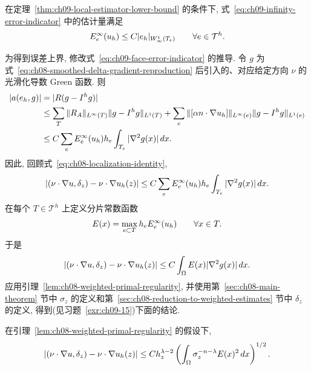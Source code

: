\begin{Theorem}
\label{thm:ch09-local-infinity-estimator}
在定理~\ref{thm:ch09-local-estimator-lower-bound} 的条件下, 式~\eqref{eq:ch09-infinity-error-indicator} 中的估计量满足
\[
\MathBookFormulaID{formula-ch09-local-infinity-estimator}
E_e^\infty(u_h)\leq C|e_h|_{W_\infty^1(T_e)}
\qquad\forall e\in\mathcal T^h.
\]
\end{Theorem}

为得到误差上界, 修改式~\eqref{eq:ch09-face-error-indicator} 的推导. 令 $g$ 为式~\eqref{eq:ch08-smoothed-delta-gradient-reproduction} 后引入的、对应给定方向 $\nu$ 的光滑化导数 Green 函数. 则
\begin{align*}
\MathBookFormulaID{formula-ch09-green-residual-estimator}
|a(e_h,g)|
&=|R(g-I^hg)|\\
&\leq\sum_T\|R_A\|_{L^\infty(T)}\|g-I^hg\|_{L^1(T)}
+\sum_e\|[\alpha n\cdot\nabla u_h]\|_{L^\infty(e)}\|g-I^hg\|_{L^1(e)}\\
&\leq C\sum_eE_e^\infty(u_h)h_e\int_{T_e}|\nabla^2g(x)|\,dx.
\end{align*}
因此, 回顾式~\eqref{eq:ch08-localization-identity},
\[
\MathBookFormulaID{formula-ch09-pointwise-gradient-estimator-sum}
|(\nu\cdot\nabla u,\delta_z)-\nu\cdot\nabla u_h(z)|
\leq C\sum_eE_e^\infty(u_h)h_e\int_{T_e}|\nabla^2g(x)|\,dx.
\]
在每个 $T\in\mathcal T^h$ 上定义分片常数函数
\begin{equation}
\MathBookFormulaID{formula-ch09-piecewise-error-density}
\label{eq:ch09-piecewise-error-density}
E(x)=\max_{e\subset T}h_eE_e^\infty(u_h)
\qquad\forall x\in T.
\end{equation}
于是
\[
\MathBookFormulaID{formula-ch09-pointwise-gradient-estimator-integral}
|(\nu\cdot\nabla u,\delta_z)-\nu\cdot\nabla u_h(z)|
\leq C\int_\Omega E(x)|\nabla^2g(x)|\,dx.
\]
应用引理~\ref{lem:ch08-weighted-primal-regularity}, 并使用第~\ref{sec:ch08-main-theorem} 节中 $\sigma_z$ 的定义和第~\ref{sec:ch08-reduction-to-weighted-estimates} 节中 $\delta_z$ 的定义, 得到(见习题~\ref{exr:ch09-15})下面的结论.

\begin{Theorem}
\label{thm:ch09-pointwise-gradient-estimator}
在引理~\ref{lem:ch08-weighted-primal-regularity} 的假设下,
\[
\MathBookFormulaID{formula-ch09-pointwise-gradient-estimator}
|(\nu\cdot\nabla u,\delta_z)-\nu\cdot\nabla u_h(z)|
\leq Ch_z^{\lambda-2}
\left(\int_\Omega\sigma_z^{-n-\lambda}E(x)^2\,dx\right)^{1/2}.
\]
\end{Theorem}

